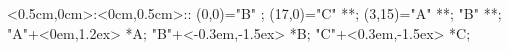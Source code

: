 %

\xy    <0.5cm,0cm>:<0cm,0.5cm>::
       (0,0)="B" ; (17,0)="C" **\dir{-}; 
       (3,15)="A" **\dir{-}; "B" **\dir{-};
	 "A"+<0em,1.2ex> *{A};
	 "B"+<-0.3em,-1.5ex> *{B};
	 "C"+<0.3em,-1.5ex> *{C};
       \endxy%

